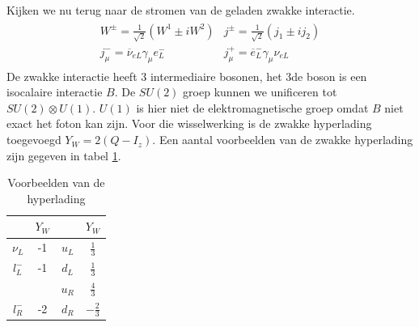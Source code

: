 \documentclass[../main.tex]{subfiles}
\begin{document}
Kijken we nu terug naar de stromen van de geladen zwakke interactie.
\begin{equation}
    \begin{aligned}
        \label{eq:stroom_geladen_zwakke_int}
        \begin{matrix}
            W^\pm = \frac{1}{\sqrt{2}} (W^1\pm iW^2) & j^\pm = \frac{1}{\sqrt{2}} (j_1\pm ij_2) \\
            j_\mu^- = \overline\nu_{eL}\gamma_\mu e_L^- & j_\mu^+ = \overline e_L^-\gamma_\mu\nu_{eL}
        \end{matrix}
    \end{aligned}
\end{equation}
De zwakke interactie heeft 3 intermediaire bosonen, het 3de boson is een isocalaire interactie $B$. De $SU(2)$ groep kunnen we unificeren tot $SU(2)\otimes U(1)$. $U(1)$ is hier niet de elektromagnetische groep omdat $B$ niet exact het foton kan zijn. Voor die wisselwerking is de zwakke hyperlading toegevoegd $Y_W = 2(Q-I_z)$. Een aantal voorbeelden van de zwakke hyperlading zijn gegeven in tabel \ref{tab:zwakke_hyperlading}.

\begin{table}[h]
    \centering
    \caption{Voorbeelden van de hyperlading}
    \label{tab:zwakke_hyperlading}
    \begin{tabular}{cccc}
                & $Y_W$ &       & $Y_W$ \\
        \hline
        $\nu_L$ & -1    & $u_L$ & $\frac{1}{3}$\\
        $l_L^-$ & -1    & $d_L$ & $\frac{1}{3}$\\
                &       & $u_R$ & $\frac{4}{3}$\\
        $l_R^-$ & -2    & $d_R$ & $-\frac{2}{3}$\\

    \end{tabular}
\end{table}
\end{document}
